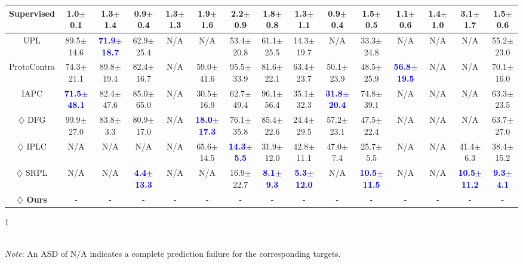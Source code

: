 \begin{table}[ht]
{\begin{tabular}{@{}ccccccccccccccc@{}}
{ Supervised}& {1.0$\pm$0.1} & {1.3$\pm$1.4} & {0.9$\pm$0.4} & {1.3$\pm$1.3} & 1.9$\pm$1.6 & {2.2$\pm$0.9} & 1.8$\pm$0.8 & 1.3$\pm$1.1 & 0.9$\pm$0.4 & 1.5$\pm$0.5 & 1.1$\pm$0.6 & 1.4$\pm$1.0 & 3.1$\pm$1.7 &  1.5$\pm$0.6\\ \midrule

{ UPL} & {89.5$\pm$14.6} & \textcolor{blue}{\textbf{71.9$\pm$18.7}} & {62.9$\pm$25.4} & {N/A} & N/A & {53.4$\pm$20.8} & {61.1$\pm$25.5} & {14.3$\pm$19.7} & {N/A} & {33.3$\pm$24.8} & {N/A} & {N/A} & {N/A} &  55.2$\pm$23.0 \\

{ ProtoContra} & {74.3$\pm$21.1} & {89.8$\pm$19.4} & {82.4$\pm$16.7} & {N/A} & {59.0$\pm$41.6} & {95.5$\pm$33.9} & {81.6$\pm$22.1} & {63.4$\pm$23.7} & {50.1$\pm$23.9} & {48.5$\pm$25.9} & \textcolor{blue}{\textbf{56.8$\pm$19.5}} & {N/A} & {N/A} &  70.1$\pm$16.0\\

{ IAPC} & \textcolor{blue}{\textbf{71.5$\pm$48.1}} & {82.4$\pm$47.6} & {85.0$\pm$65.0} & {N/A} & 30.5$\pm$16.9 & 62.7$\pm$49.4 & 96.1$\pm$56.4 & 35.1$\pm$32.3 & \textcolor{blue}{\textbf{31.8$\pm$20.4}} & 74.8$\pm$39.1 & {N/A} & {N/A} & {N/A} &  63.3$\pm$23.5\\

{ $\diamondsuit$ DFG} & {99.9$\pm$27.0} & {83.8$\pm$3.3} & {80.9$\pm$17.0} & {N/A} & \textcolor{blue}{\textbf{18.0$\pm$17.3}} & {76.1$\pm$35.8} & 85.4$\pm$22.6 & 24.4$\pm$29.5 & 57.2$\pm$23.1 & 47.5$\pm$22.4 & {N/A} & {N/A} & {N/A} &  63.7$\pm$27.0 \\

{ $\diamondsuit$ IPLC} & {N/A} & {N/A} & {N/A} & {N/A}& {65.6$\pm$14.5} & \textcolor{blue}{\textbf{14.3$\pm$5.5}} & {31.9$\pm$12.0}  & 42.8$\pm$11.1 & 47.0$\pm$7.4 & 25.7$\pm$5.5 & {N/A} & {N/A} & 41.4$\pm$6.3 &  38.4$\pm$15.2\\

{ $\diamondsuit$ SRPL} & {N/A} & {N/A} & \textcolor{blue}{\textbf{4.4$\pm$13.3}} & {N/A} & {N/A} & {16.9$\pm$22.7} & \textcolor{blue}{\textbf{8.1$\pm$9.3}} & \textcolor{blue}{\textbf{5.3$\pm$12.0}} & {N/A} & \textcolor{blue}{\textbf{10.5$\pm$11.5}} & {N/A} & {N/A} & \textcolor{blue}{\textbf{10.5$\pm$11.2}} &  \textcolor{blue}{\textbf{9.3$\pm$4.1}}\\ \midrule

{ \textbf{$\diamondsuit$ Ours}} & {-}& {-}& {-} & {-}& {-}& {-}& {-}& {-}& {-}& {-}& {-}& {-}& {-}& {-}\\ 
\bottomrule
\end{tabular}%
1}
\\[2pt]  %
\footnotesize\textit{Note}: An ASD of N/A indicates a complete prediction failure for the corresponding targets.

\vspace{-5mm}
\end{table}